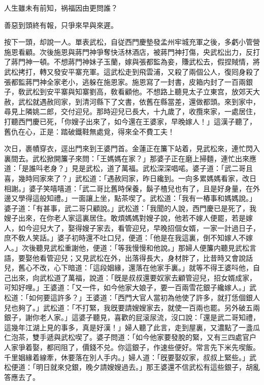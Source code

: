 \begin{myquote}
人生雖未有前知，祸福因由更問誰？

善惡到頭終有報，只爭來早與來遲。
\end{myquote}

按下一頭，却說一人。單表武松，自従西門慶墊發孟州牢城充軍之後，多虧小管營施恩看顧。次後施恩與蔣門神爭奪快活林酒店，被蔣門神打傷，央武松出力，反打了蔣門神一頓。不想蔣門神妹子玉蘭，嫁與張都監為妾，賺武松去，假捏賊情，將武松拷打，轉又發安平寨充軍。這武松走到飛雲浦，又殺了兩個公人，復囘身殺了張都監蔣門神全家老小，逃躲在施恩家。施恩寫了一封書，皮箱内封了一百兩銀子，敎武松到安平寨與知寨劉高，敎看顧他。不想路上聽見太子立東宫，放郊天大赦，武松就遇赦囘家，到清河縣下了文書，依舊在縣當差，還做都頭。來到家中，尋見上隣姚二郎，交付迎兒。那時迎兒已長大，十九歲了，收攬來家，一處居住，打聽西門慶已死，「你嫂子出來了，如今還在王婆家，早晚嫁人！」這漢子聽了，舊仇在心，正是：踏破鐵鞋無處覓，得來全不費工夫！

次日，裹幘穿衣，逕出門來到王婆門首。金蓮正在簾下站着，見武松來，連忙閃入裏間去。武松掀開簾子來問：「王媽媽在家？」那婆子正在磨上掃麵，連忙出來應道：「是誰呌老身？」見是武松，道了萬福。武松深深唱喏。婆子道：「武二哥且喜，幾時囘家來了？」武松道：「遇赦囘家，昨日纔到。一向多累媽媽看家，改日相謝。」婆子笑嘻嘻道：「武二哥比舊時保養，鬍子楂兒也有了，且是好身量，在外邊又學得這般知禮。」一面讓上坐，點茶喫了。武松道：「我有一樁事和媽媽說。」婆子道：「有甚事，武二哥只顧說。」武松道：「我聞的人說，西門慶已是死了，我嫂子出來，在你老人家這裏居住。敢煩媽媽對嫂子說，他若不嫁人便罷，若是嫁人，如今迎兒大了，娶得嫂子家去，看管迎兒，早晚招個女婿，一家一計過日子，庶不敎人笑話。」婆子初時還不吐口兒，便道：「他是在我這裏，倒不知嫁人不嫁人。」次後聽見武松重謝他，便道：「等我慢慢和他說。」那婦人便簾内聽見武松言語，要娶他看管迎兒；又見武松在外，出落得長大，身材胖了，比昔時又會說話兒，舊心不改，心下暗道：「這段姻緣，還落在他家手裏。」就等不得王婆呌他，自己出來，向武松道了萬福，說道：「旣是叔叔還要奴家去顧管迎兒，招女婿成家，可知好哩。」王婆道：「又一件，如今他家大娘子，要一百兩雪花銀子纔嫁人。」武松道：「如何要這許多？」王婆道：「西門大官人當初為他使了許多，就打恁個銀人兒也夠了。」武松道：「不打緊，我旣要請嫂嫂家去，就使一百兩也罷。另外破五兩銀子，謝你老人家。」這婆子聽見，喜歡的屁滚尿流，沒口說：「還是武二哥知禮，這幾年江湖上見的事多，真是好漢！」婦人聽了此言，走到屋裏，又濃點了一盞瓜仁泡茶，雙手遞與武松喫了。婆子問道：「如今他家要發脫的緊，又有三四處官户人家爭着娶，都囘阻了，價錢不兑。你這銀子，作速些便好。常言先下米先喫飯。千里姻緣着線牽，休要落在別人手内。」婦人道：「旣要娶奴家，叔叔上緊些。」武松便道：「明日就來兌銀，晚夕請嫂嫂過去。」那王婆還不信武松有這些銀子，胡亂答應去了。

